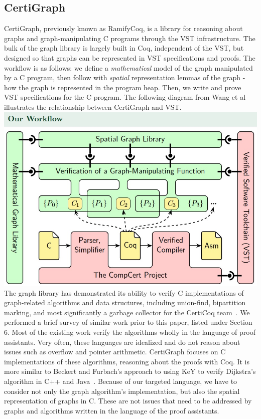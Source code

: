\subsection{CertiGraph}

CertiGraph, previously known as RamifyCoq, is a library for reasoning about graphs and graph-manipulating C programs through the VST infrastructure. The bulk of the graph library is largely built in Coq, independent of the VST, but designed so that graphs can be represented in VST specifications and proofs.
\newline\newline
The workflow is as follows: we define a \textit{mathematical} model of the graph manipulated by a C program, then follow with \textit{spatial} representation lemmas of the graph - how the graph is represented in the program heap. Then, we write and prove VST specifications for the C program. The following diagram from Wang et al~\cite{DBLP:journals/pacmpl/WangCMH19} illustrates the relationship between CertiGraph and VST.
\newline\newline
\includegraphics[scale=0.76]{certigraph_dep.jpg}
\newline\newline
The graph library has demonstrated its ability to verify C implementations of graph-related algorithms and data structures, including union-find, bipartition marking, and most significantly a garbage collector for the CertiCoq team~\cite{DBLP:journals/pacmpl/WangCMH19}.
\newline\newline
We performed a brief survey of similar work prior to this paper, listed under Section 6. Most of the existing work verify the algorithms wholly in the language of proof assistants. Very often, these languages are idealized and do not reason about issues such as overflow and pointer arithmetic. CertiGraph focuses on C implementations of these algorithms, reasoning about the proofs with Coq. It is more similar to Beckert and Furbach's approach to using KeY to verify Dijkstra's algorithm in C++ and Java~\cite{klasen2010verifying}. Because of our targeted language, we have to consider not only the graph algorithm's implementation, but also the spatial representation of graphs in C. These are not issues that need to be addressed by graphs and algorithms written in the language of the proof assistants.
